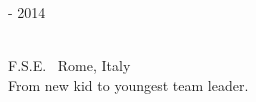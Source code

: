\bigskip

\begin{minipage}{.3\textwidth}
	 - 2014 \faCalendar
\end{minipage}
\hfill
\begin{minipage}{.64\textwidth}
	\vfill
	 \\
	\color{Maroon} F.S.E. \color{Sepia} \hfill \faMapMarker \ Rome, Italy
	\smallskip
	\\
	\color{gray} From new kid to youngest team leader.
	\vfill
\end{minipage}
